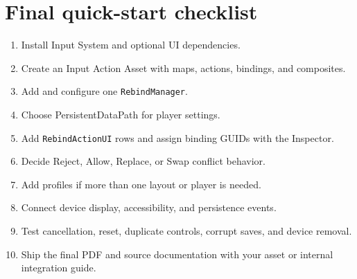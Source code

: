 \documentclass[11pt,a4paper]{article}
\newcommand{\class}[1]{\texttt{#1}}
\begin{document}
\section{Final quick-start checklist}
\begin{enumerate}
  \item Install Input System and optional UI dependencies.
  \item Create an Input Action Asset with maps, actions, bindings, and composites.
  \item Add and configure one \class{RebindManager}.
  \item Choose PersistentDataPath for player settings.
  \item Add \class{RebindActionUI} rows and assign binding GUIDs with the Inspector.
  \item Decide Reject, Allow, Replace, or Swap conflict behavior.
  \item Add profiles if more than one layout or player is needed.
  \item Connect device display, accessibility, and persistence events.
  \item Test cancellation, reset, duplicate controls, corrupt saves, and device removal.
  \item Ship the final PDF and source documentation with your asset or internal integration guide.
\end{enumerate}
\end{document}
